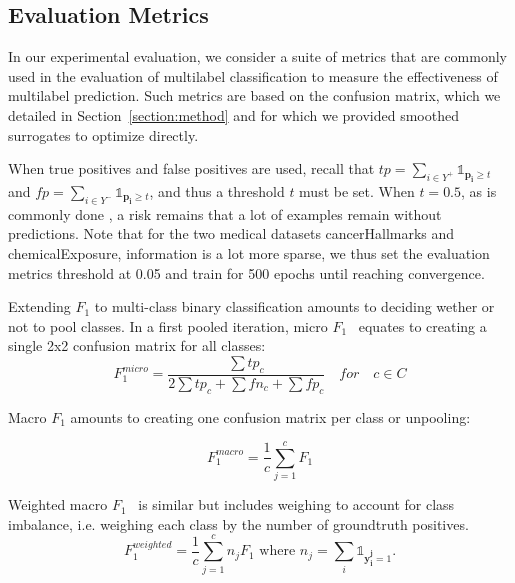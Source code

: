 \subsection{Evaluation Metrics}
\label{sec:org23c8447}

In our experimental evaluation, we consider a suite of metrics that are commonly used in the evaluation of multilabel classification to measure the effectiveness of multilabel prediction. Such metrics are based on the confusion matrix, which we detailed in Section~\ref{section:method} and for which we provided smoothed surrogates to optimize directly.

When true positives and false positives are used, recall that \(t p=\sum_{i \in Y^{+}} \mathds{1}_{\mathbf{p_i} \geq t}\) and \(f p=\sum_{i \in Y^{-}} \mathds{1}_{\mathbf{p_i} \geq t}\), and thus a threshold \(t\) must be set. When \(t = 0.5\), as is commonly done , a risk remains that a lot of examples remain without predictions. 
Note that for the two medical datasets cancerHallmarks and chemicalExposure, information is a lot more sparse, we thus set the evaluation metrics threshold at 0.05 and train for 500 epochs until reaching convergence. 

Extending \(F_1\) to multi-class binary classification amounts to deciding wether or not to pool classes.
In a first pooled iteration, micro \(F_1\)~\cite{multilabelMetrics} equates to creating a single 2x2 confusion matrix for all classes:
$$F_1^{micro} = \frac{\sum tp_c}{2 \sum tp_c + \sum fn_c + \sum fp_c} \quad for \quad c \in C$$

Macro \(F_1\) \cite{threshForF1, multilabelMetrics} amounts to creating one confusion matrix per class or unpooling:

$$F_1^{macro} = \frac{1}{c} \sum_{j=1}^c F_1$$


Weighted macro \(F_1\)~\cite{weightedMetrics} is similar but includes weighing to account for class imbalance, i.e. weighing each class by the number of groundtruth positives.
\begin{equation}
F_1^{weighted} = \frac{1}{c} \sum_{j=1}^c n_j F_1 \text{ where } n_j = \sum_i \mathds{1}_{\mathbf{y_i^j} = 1}.
\end{equation}


